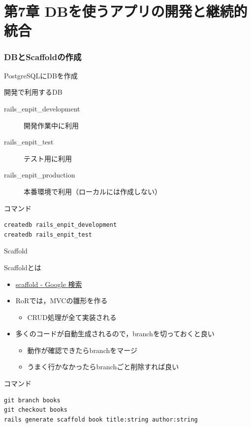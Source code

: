 \documentclass[t, aspectratio=169]{beamer}
\begin{document}
\part{第7章 DBを使うアプリの開発と継続的統合}
\label{sec-7}
\section{DBとScaffoldの作成}
\label{sec-7-1}
\begin{frame}[fragile,label=sec-7-1-1]{PostgreSQLにDBを作成}
 \begin{block}{開発で利用するDB}
\begin{description}
\item[{rails\_enpit\_development}] 開発作業中に利用
\item[{rails\_enpit\_test}] テスト用に利用
\item[{rails\_enpit\_production}] 本番環境で利用（ローカルには作成しない）
\end{description}
\end{block}
\begin{block}{コマンド}
\begin{verbatim}
createdb rails_enpit_development
createdb rails_enpit_test
\end{verbatim}
\end{block}
\end{frame}

\begin{frame}[fragile,label=sec-7-1-2]{Scaffold}
 \begin{block}{Scaffoldとは}
\begin{itemize}
\item \href{https://www.google.co.jp/search?q=scaffold&client=ubuntu&hs=PiK&channel=fs&hl=ja&source=lnms&tbm=isch&sa=X&ei=smUdVKaZKY7s8AXew4LwDw&ved=0CAgQ_AUoAQ&biw=1195&bih=925}{scaffold - Google 検索}
\item RoRでは，MVCの雛形を作る
\begin{itemize}
\item CRUD処理が全て実装される
\end{itemize}
\item 多くのコードが自動生成されるので，branchを切っておくと良い
\begin{itemize}
\item 動作が確認できたらbranchをマージ
\item うまく行かなかったらbranchごと削除すれば良い
\end{itemize}
\end{itemize}
\end{block}
\begin{block}{コマンド}
\begin{verbatim}
git branch books
git checkout books
rails generate scaffold book title:string author:string
\end{verbatim}
\end{block}
\end{frame}
\end{document}
